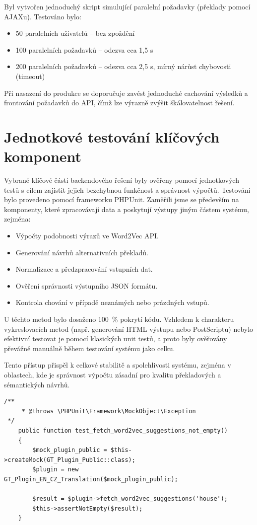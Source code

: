 \documentclass[czech, ba, kiv, he]{fasthesis}
\begin{document}
Byl vytvořen jednoduchý skript simulující paralelní požadavky (překlady pomocí AJAXu). Testováno bylo:

\begin{itemize}
    \item 50 paralelních uživatelů – bez zpoždění
    \item 100 paralelních požadavků – odezva cca 1{,}5 s
    \item 200 paralelních požadavků – odezva cca 2{,}5 s, mírný nárůst chybovosti (timeout)
\end{itemize}

Při nasazení do produkce se doporučuje zavést jednoduché cachování výsledků a frontování požadavků do API, čímž lze výrazně zvýšit škálovatelnost řešení.

\section{Jednotkové testování klíčových komponent}

Vybrané klíčové části backendového řešení byly ověřeny pomocí jednotkových testů s cílem zajistit jejich bezchybnou funkčnost a správnost výpočtů. Testování bylo provedeno pomocí frameworku PHPUnit. Zaměřili jsme se především na komponenty, které zpracovávají data a poskytují výstupy jiným částem systému, zejména:

\begin{itemize} 
	\item Výpočty podobnosti výrazů ve Word2Vec API.
	\item Generování návrhů alternativních překladů. 
	\item Normalizace a předzpracování vstupních dat. 
	\item Ověření správnosti výstupního JSON formátu. 
	\item Kontrola chování v případě neznámých nebo prázdných vstupů. 
\end{itemize}

U těchto metod bylo dosaženo 100~\% pokrytí kódu. Vzhledem k charakteru vykreslovacích metod (např. generování HTML výstupu nebo PostScriptu) nebylo efektivní testovat je pomocí klasických unit testů, a proto byly ověřovány převážně manuálně během testování systému jako celku.

Tento přístup přispěl k celkové stabilitě a spolehlivosti systému, zejména v oblastech, kde je správnost výpočtu zásadní pro kvalitu překladových a sémantických návrhů.

\begin{lstlisting}[caption={Ukázka jednoho z několika Unit testů.}]
/**
     * @throws \PHPUnit\Framework\MockObject\Exception
 */
    public function test_fetch_word2vec_suggestions_not_empty()
    {
        $mock_plugin_public = $this->createMock(GT_Plugin_Public::class);
        $plugin = new GT_Plugin_EN_CZ_Translation($mock_plugin_public);

        $result = $plugin->fetch_word2vec_suggestions('house');
        $this->assertNotEmpty($result);
    }
\end{lstlisting}
\end{document}
